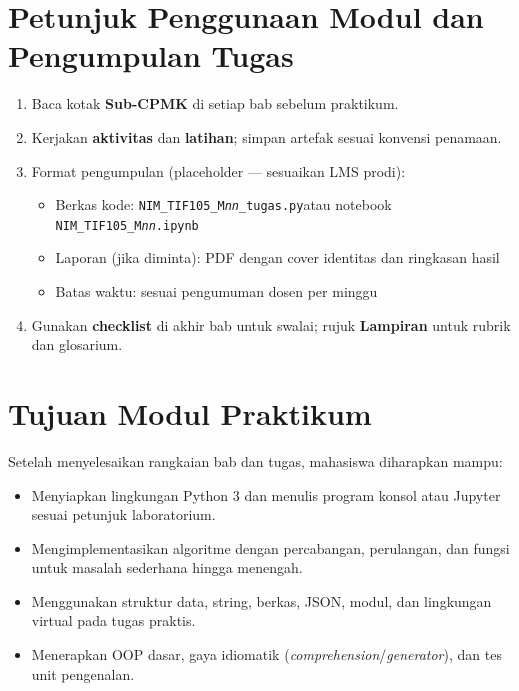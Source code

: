\documentclass[../main.tex]{subfiles}
\begin{document}
\section{Petunjuk Penggunaan Modul dan Pengumpulan Tugas}

\begin{enumerate}[leftmargin=*]
  \item Baca kotak \textbf{Sub-CPMK} di setiap bab sebelum praktikum.
  \item Kerjakan \textbf{aktivitas} dan \textbf{latihan}; simpan artefak sesuai konvensi penamaan.
  \item Format pengumpulan (placeholder --- sesuaikan LMS prodi):
  \begin{itemize}
    \item Berkas kode: \texttt{NIM\_TIF105\_M\textit{nn}\_tugas.py}\newline atau notebook \texttt{NIM\_TIF105\_M\textit{nn}.ipynb}
    \item Laporan (jika diminta): PDF dengan cover identitas dan ringkasan hasil
    \item Batas waktu: sesuai pengumuman dosen per minggu
  \end{itemize}
  \item Gunakan \textbf{checklist} di akhir bab untuk swalai; rujuk \textbf{Lampiran} untuk rubrik dan glosarium.
\end{enumerate}

\section{Tujuan Modul Praktikum}

Setelah menyelesaikan rangkaian bab dan tugas, mahasiswa diharapkan mampu:

\begin{itemize}[leftmargin=*]
  \item Menyiapkan lingkungan Python 3 dan menulis program konsol atau Jupyter sesuai petunjuk laboratorium.
  \item Mengimplementasikan algoritme dengan percabangan, perulangan, dan fungsi untuk masalah sederhana hingga menengah.
  \item Menggunakan struktur data, string, berkas, JSON, modul, dan lingkungan virtual pada tugas praktis.
  \item Menerapkan OOP dasar, gaya idiomatik (\textit{comprehension}/\textit{generator}), dan tes unit pengenalan.
\end{itemize}
\end{document}
